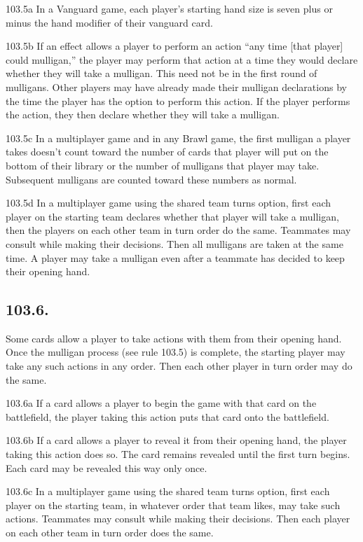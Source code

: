 103.5a In a Vanguard game, each player’s starting hand size is seven plus or minus the hand modifier of their vanguard card.

103.5b If an effect allows a player to perform an action “any time [that player] could mulligan,” the player may perform that action at a time they would declare whether they will take a mulligan. This need not be in the first round of mulligans. Other players may have already made their mulligan declarations by the time the player has the option to perform this action. If the player performs the action, they then declare whether they will take a mulligan.

103.5c In a multiplayer game and in any Brawl game, the first mulligan a player takes doesn’t count toward the number of cards that player will put on the bottom of their library or the number of mulligans that player may take. Subsequent mulligans are counted toward these numbers as normal.

103.5d In a multiplayer game using the shared team turns option, first each player on the starting team declares whether that player will take a mulligan, then the players on each other team in turn order do the same. Teammates may consult while making their decisions. Then all mulligans are taken at the same time. A player may take a mulligan even after a teammate has decided to keep their opening hand.

\subsection*{103.6.}
Some cards allow a player to take actions with them from their opening hand. Once the mulligan process (see rule 103.5) is complete, the starting player may take any such actions in any order. Then each other player in turn order may do the same.

103.6a If a card allows a player to begin the game with that card on the battlefield, the player taking this action puts that card onto the battlefield.

103.6b If a card allows a player to reveal it from their opening hand, the player taking this action does so. The card remains revealed until the first turn begins. Each card may be revealed this way only once.

103.6c In a multiplayer game using the shared team turns option, first each player on the starting team, in whatever order that team likes, may take such actions. Teammates may consult while making their decisions. Then each player on each other team in turn order does the same.

